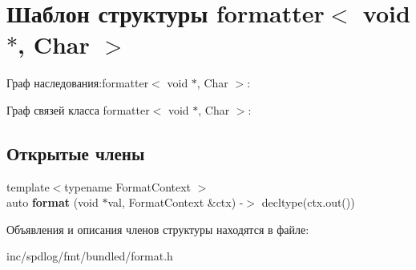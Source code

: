 \hypertarget{structformatter_3_01void_01_5_00_01Char_01_4}{}\section{Шаблон структуры formatter$<$ void $\ast$, Char $>$}
\label{structformatter_3_01void_01_5_00_01Char_01_4}


Граф наследования\+:formatter$<$ void $\ast$, Char $>$\+:


Граф связей класса formatter$<$ void $\ast$, Char $>$\+:
\subsection*{Открытые члены}
\begin{DoxyCompactItemize}
\item 
\mbox{\label{structformatter_3_01void_01_5_00_01Char_01_4_ad65a1d23126765982b101ee86da7e5b8}} 
{\footnotesize template$<$typename Format\+Context $>$ }\\auto {\bfseries format} (void $\ast$val, Format\+Context \&ctx) -\/$>$ decltype(ctx.\+out())
\end{DoxyCompactItemize}


Объявления и описания членов структуры находятся в файле\+:\begin{DoxyCompactItemize}
\item 
inc/spdlog/fmt/bundled/format.\+h\end{DoxyCompactItemize}
